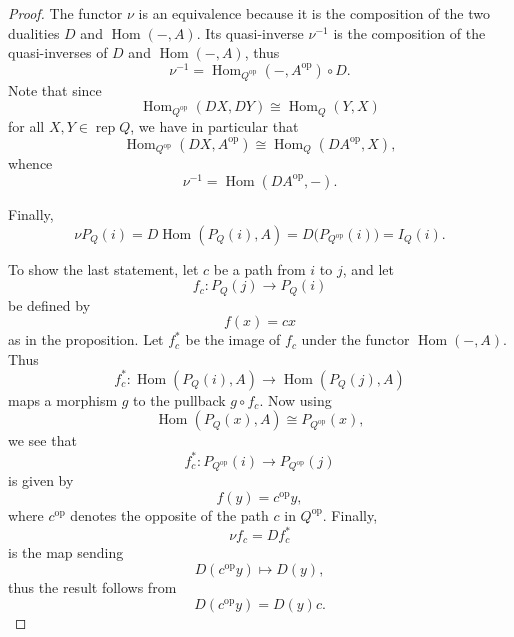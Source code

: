 \documentclass[11pt, a4paper]{report}
\begin{document}
                    \begin{proof}
                    The functor $\nu$ is an equivalence because it is the composition of the two dualities
                    $D$ and $\operatorname{Hom}(-,A)$. Its quasi-inverse $\nu^{-1}$ is the composition of the
                    quasi-inverses of $D$ and $\operatorname{Hom}(-,A)$, thus
                    \[
                    \nu^{-1}=\operatorname{Hom}_{Q^{\operatorname{op}}}(-,A^{\operatorname{op}})\circ D.
                    \]
                    Note that since
                    \[
                    \operatorname{Hom}_{Q^{\operatorname{op}}}(DX,DY)\cong \operatorname{Hom}_Q(Y,X)
                    \]
                    for all $X,Y\in \operatorname{rep} Q$, we have in particular that
                    \[
                    \operatorname{Hom}_{Q^{\operatorname{op}}}(DX,A^{\operatorname{op}})
                    \cong
                    \operatorname{Hom}_Q(DA^{\operatorname{op}},X),
                    \]
                    whence
                    \[
                    \nu^{-1}=\operatorname{Hom}(DA^{\operatorname{op}},-).
                    \]

                    Finally,
                    \[
                    \nu P_Q(i)=D\operatorname{Hom}(P_Q(i),A)
                    = D\bigl(P_{Q^{\operatorname{op}}}(i)\bigr)
                    = I_Q(i).
                    \]

                    To show the last statement, let $c$ be a path from $i$ to $j$, and let
                    \[
                    f_c\colon P_Q(j)\to P_Q(i)
                    \]
                    be defined by
                    \[
                    f(x)=cx
                    \]
                    as in the proposition. Let $f_c^*$ be the image of $f_c$ under the functor
                    $\operatorname{Hom}(-,A)$. Thus
                    \[
                    f_c^*\colon \operatorname{Hom}(P_Q(i),A)\to \operatorname{Hom}(P_Q(j),A)
                    \]
                    maps a morphism $g$ to the pullback $g\circ f_c$. Now using
                    \[
                    \operatorname{Hom}(P_Q(x),A)\cong P_{Q^{\operatorname{op}}}(x),
                    \]
                    we see that
                    \[
                    f_c^*\colon P_{Q^{\operatorname{op}}}(i)\to P_{Q^{\operatorname{op}}}(j)
                    \]
                    is given by
                    \[
                    f(y)=c^{\operatorname{op}}y,
                    \]
                    where $c^{\operatorname{op}}$ denotes the opposite of the path $c$ in $Q^{\operatorname{op}}$.
                    Finally,
                    \[
                    \nu f_c = Df_c^*
                    \]
                    is the map sending
                    \[
                    D(c^{\operatorname{op}}y)\mapsto D(y),
                    \]
                    thus the result follows from
                    \[
                    D(c^{\operatorname{op}}y)=D(y)c.
                    \]
                    \end{proof}
\end{document}
